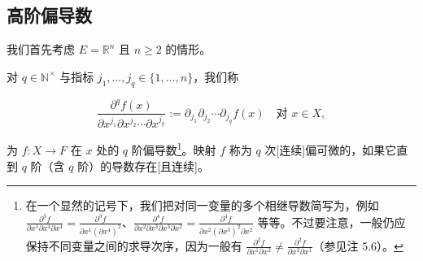 \subsection*{高阶偏导数}

我们首先考虑 $ E = \mathbb{R}^{n} $ 且 $ n \ge 2 $ 的情形。

对 $ q \in \mathbb{N}^{\times} $ 与指标 $ j_{1}, \ldots, j_{q} \in \{1, \ldots, n\} $，我们称

\[
\frac{\partial^{q}f(x)}{\partial x^{j_{1}}\partial x^{j_{2}}\cdots\partial x^{j_{q}}} := \partial_{j_{1}}\partial_{j_{2}}\cdots\partial_{j_{q}}f(x) \quad \text{对 } x \in X ,
\]

为 $ f : X \to F $ 在 $ x $ 处的 $ q $ 阶偏导数\footnote{在一个显然的记号下，我们把对同一变量的多个相继导数简写为，例如 $ \frac{\partial^{3}f}{\partial x^{1}\partial x^{4}\partial x^{4}} = \frac{\partial^{3}f}{\partial x^{1}(\partial x^{4})^{2}} $、$ \frac{\partial^{4}f}{\partial x^{2}\partial x^{3}\partial x^{3}\partial x^{2}} = \frac{\partial^{4}f}{\partial x^{2}(\partial x^{3})^{2}\partial x^{2}} $ 等等。不过要注意，一般仍应保持不同变量之间的求导次序，因为一般有 $ \frac{\partial^{2}f}{\partial x^{1}\partial x^{2}} \ne \frac{\partial^{2}f}{\partial x^{2}\partial x^{1}} $（参见注 5.6）。}。映射 $ f $ 称为 $ q $ 次[连续]偏可微的，如果它直到 $ q $ 阶（含 $ q $ 阶）的导数存在[且连续]。

